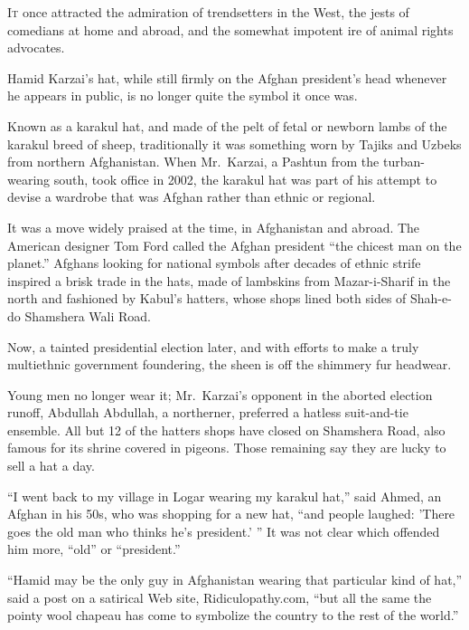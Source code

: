 ﻿\documentclass[12pt]{article}
\begin{document}
\lettrine{I}{t} once attracted the admiration of trendsetters in the West,
the jests of comedians at home and abroad, and the somewhat impotent ire of animal rights advocates.

Hamid Karzai's hat, while still firmly on the Afghan president's head whenever he appears in public,
is no longer quite the symbol it once was.

Known as a karakul hat, and made of the pelt of fetal or newborn lambs of the karakul breed of
sheep, traditionally it was something worn by Tajiks and Uzbeks from northern Afghanistan. When
Mr.~Karzai, a Pashtun from the turban-wearing south, took office in 2002, the karakul hat was part
of his attempt to devise a wardrobe that was Afghan rather than ethnic or regional.


It was a move widely praised at the time, in Afghanistan and abroad. The American designer Tom Ford
called the Afghan president ``the chicest man on the planet.'' Afghans looking for national symbols
after decades of ethnic strife inspired a brisk trade in the hats, made of lambskins from
Mazar-i-Sharif in the north and fashioned by Kabul's hatters, whose shops lined both sides of
Shah-e-do Shamshera Wali Road.

Now, a tainted presidential election later, and with efforts to make a truly multiethnic government
foundering, the sheen is off the shimmery fur headwear.

Young men no longer wear it; Mr.~Karzai's opponent in the aborted election runoff, Abdullah
Abdullah, a northerner, preferred a hatless suit-and-tie ensemble. All but 12 of the hatters shops
have closed on Shamshera Road, also famous for its shrine covered in pigeons. Those remaining say
they are lucky to sell a hat a day.

``I went back to my village in Logar wearing my karakul hat,'' said Ahmed, an Afghan in his 50s, who
was shopping for a new hat, ``and people laughed: 'There goes the old man who thinks he's
president.' '' It was not clear which offended him more, ``old'' or ``president.''

``Hamid may be the only guy in Afghanistan wearing that particular kind of hat,'' said a post on a
satirical Web site, Ridiculopathy.com, ``but all the same the pointy wool chapeau has come to
symbolize the country to the rest of the world.''
\end{document}
